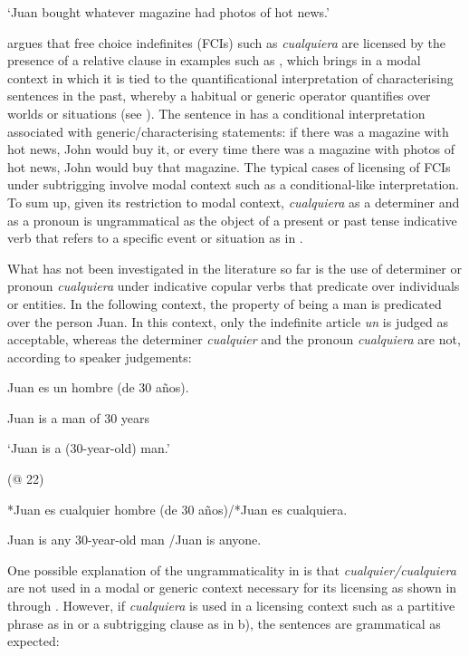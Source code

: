 \documentclass[output=paper]{langscibook}
\begin{document}
    ‘Juan bought whatever magazine had photos of hot news.’ 

    \citep[67]{Rivero2011}

\citet{Quer2000} argues that free choice indefinites (FCIs) such as \textit{cualquiera} are licensed by the presence of a relative clause in examples such as , which brings in a modal context in which it is tied to the quantificational interpretation of characterising sentences in the past, whereby a habitual or generic operator quantifies over worlds or situations (see \citealt{KrifkaEtAl1995}). The sentence in  has a conditional interpretation associated with generic/characterising statements: if there was a magazine with hot news, John would buy it, or every time there was a magazine with photos of hot news, John would buy that magazine. The typical cases of licensing of FCIs under subtrigging involve modal context such as a conditional-like interpretation. To sum up, given its restriction to modal context, \textit{cualquiera} as a determiner and as a pronoun is ungrammatical as the object of a present or past tense indicative verb that refers to a specific event or situation as in . 

  What has not been investigated in the literature so far is the use of determiner or pronoun \textit{cualquiera} under indicative copular verbs that predicate over individuals or entities. In the following context, the property of being a man is predicated over the person Juan. In this context, only the indefinite article \textit{un} is judged as acceptable, whereas the determiner \textit{cualquier} and the pronoun \textit{cualquiera} are not, according to speaker judgements:

  Juan  es  un  hombre  (de  30  años).

  Juan  is  a  man  of  30  years

  ‘Juan is a (30-year-old) man.’

  (@ 22)

\label{bkm:Ref513974}  *Juan es cualquier hombre (de 30 años)/*Juan es cualquiera. 

  Juan is any 30-year-old man /Juan is anyone.

One possible explanation of the ungrammaticality in  is that \textit{cualquier/cualquiera} are not used in a modal or generic context necessary for its licensing as shown in  through . However, if \textit{cualquiera} is used in a licensing context such as a partitive phrase as in  or a subtrigging clause as in b), the sentences are grammatical as expected:
\end{document}
